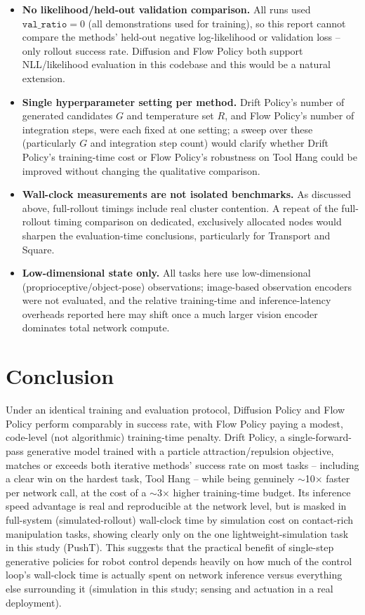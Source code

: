 \documentclass[11pt]{article}
\begin{document}
\begin{itemize}
\item \textbf{No likelihood/held-out validation comparison.} All runs used
$\texttt{val\_ratio}=0$ (all demonstrations used for training), so this
report cannot compare the methods' held-out negative log-likelihood or
validation loss -- only rollout success rate. Diffusion and Flow Policy both
support NLL/likelihood evaluation in this codebase and this would be a
natural extension.
\item \textbf{Single hyperparameter setting per method.} Drift Policy's
number of generated candidates $G$ and temperature set $R$, and Flow
Policy's number of integration steps, were each fixed at one setting; a
sweep over these (particularly $G$ and integration step count) would
clarify whether Drift Policy's training-time cost or Flow Policy's
robustness on Tool Hang could be improved without changing the qualitative
comparison.
\item \textbf{Wall-clock measurements are not isolated benchmarks.} As
discussed above, full-rollout timings include real cluster contention.
A repeat of the full-rollout timing comparison on dedicated, exclusively
allocated nodes would sharpen the evaluation-time conclusions, particularly
for Transport and Square.
\item \textbf{Low-dimensional state only.} All tasks here use
low-dimensional (proprioceptive/object-pose) observations; image-based
observation encoders were not evaluated, and the relative training-time and
inference-latency overheads reported here may shift once a much larger
vision encoder dominates total network compute.
\end{itemize}

\section{Conclusion}

Under an identical training and evaluation protocol, Diffusion Policy and
Flow Policy perform comparably in success rate, with Flow Policy paying a
modest, code-level (not algorithmic) training-time penalty. Drift Policy, a
single-forward-pass generative model trained with a particle
attraction/repulsion objective, matches or exceeds both iterative methods'
success rate on most tasks -- including a clear win on the hardest task,
Tool Hang -- while being genuinely $\sim$10$\times$ faster per network call,
at the cost of a $\sim$3$\times$ higher training-time budget. Its inference
speed advantage is real and reproducible at the network level, but is
masked in full-system (simulated-rollout) wall-clock time by simulation cost
on contact-rich manipulation tasks, showing clearly only on the one
lightweight-simulation task in this study (PushT). This suggests that the
practical benefit of single-step generative policies for robot control
depends heavily on how much of the control loop's wall-clock time is
actually spent on network inference versus everything else surrounding it
(simulation in this study; sensing and actuation in a real deployment).
\end{document}
